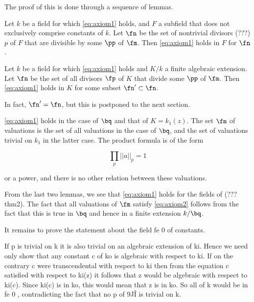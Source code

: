 The proof of this is done through a sequence of lemmas.

\begin{lemma}
 Let $k$ be a field for which \ref{eq:axiom1} holds, and $F$ a subfield that
 does not exclusively comprise constants of $k$. Let $\fn$ be the set of
 nontrivial divisors (???) $p$ of $F$ that are divisible by some $\pp$ of $\fm$.
 Then \ref{eq:axiom1} holds in $F$ for $\fn$.
\end{lemma}

\begin{lemma}
Let $k$ be a field for which \ref{eq:axiom1} holds and $K/k$ a finite algebraic
extension. Let $\fn$ be the set of all divisors $\fp$ of $K$ that divide some
$\pp$ of $\fm$. Then \ref{eq:axiom1} holds in $K$ for some subset $\fn' \subset \fn$.
\end{lemma}

In fact, $\fn' = \fn$, but this is postponed to the next section.

\begin{lemma}
\ref{eq:axiom1} holds in the case of $\bq$ and that of $K=k_1(z)$. The set $\fm$
of valuations is the set of all valuations in the case of $\bq$, and the set of
valuations trivial on $k_1$ in the latter case. The product formula is of the
form

\[ \prod_p {||a||}_p = 1 \]

or a power, and there is no other relation between these valuations.

\end{lemma}

From the last two lemmas, we see that \ref{eq:axiom1} holds for the fields of
(??? thm2). The fact that all valuations of $\fm$ satisfy \ref{eq:axiom2}
follows from the fact that this is true in $\bq$ and hence in a finite extension
$k/\bq$.

It  remains  to  prove  the  statement  about  the  field  fe 0   of  constants.

If  p  is  trivial  on   k   it  is  also  trivial  on  an  algebraic  extension  of    ki.    Hence  we  need  only  show  that  any  constant   c   of   ko  is  algebraic  with   respect  to   ki.   If  on  the  contrary   c  were  transcendental  with  respect   to   ki   then  from  the  equation   c  satisfied  with  respect  to   ki(z)   it  follows   that   z   would  be  algebraic  with  respect  to   ki(c).    Since   ki(c)    is  in   ko,   this would  mean that   z  is in   ko.  So all  of   k  would be in fe 0 , contradicting  the  fact  that  no  p of  9JÎ is trivial  on   k.

